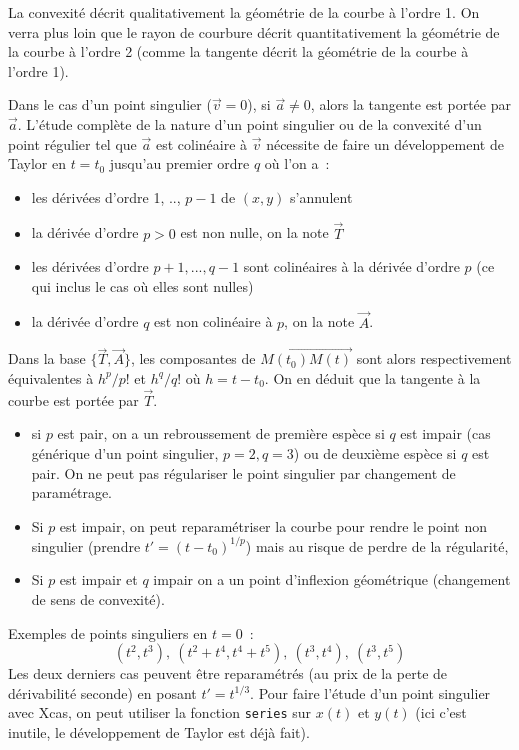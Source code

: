 \documentclass[a4paper,11pt]{article}
\begin{document}
La convexit\'e d\'ecrit qualitativement la g\'eom\'etrie
de la courbe \`a l'ordre 1. On verra plus loin que le rayon de courbure d\'ecrit
quantitativement la g\'eom\'etrie de la courbe \`a l'ordre
2 (comme la tangente d\'ecrit la g\'eom\'etrie de la courbe
\`a l'ordre 1).

Dans le cas d'un point singulier ($\overrightarrow{v}=0$), si 
$\overrightarrow{a}\neq 0$, alors la
tangente est port\'ee par $\overrightarrow{a}$. L'\'etude compl\`ete
de la nature
d'un point singulier ou de la convexit\'e d'un point r\'egulier
tel que $\overrightarrow{a}$ est colin\'eaire \`a $\overrightarrow{v}$ 
n\'ecessite de faire un
d\'eveloppement de Taylor en $t=t_0$
jusqu'au premier ordre $q$ o\`u l'on a~: 
\begin{itemize}
\item les d\'eriv\'ees d'ordre 1, .., $p-1$ de $(x,y)$ s'annulent
\item la d\'eriv\'ee d'ordre $p>0$ est non nulle, on la note $\overrightarrow{T}$
\item les d\'eriv\'ees d'ordre $p+1,...,q-1$ sont colin\'eaires
\`a la d\'eriv\'ee d'ordre $p$ (ce qui inclus le cas o\`u elles
sont nulles)
\item la d\'eriv\'ee d'ordre $q$ est non colin\'eaire \`a $p$,
on la note $\overrightarrow{A}$.
\end{itemize}
Dans la base $\{ \overrightarrow{T},\overrightarrow{A}\}$, les
composantes de $\overrightarrow{M(t_0)M(t)}$
sont alors respectivement \'equivalentes \`a $h^p/p!$ et $h^q/q!$
o\`u $h=t-t_0$.
On en d\'eduit que la tangente \`a la courbe est port\'ee par
$\overrightarrow{T}$.
\begin{itemize}
\item si $p$ est pair, on a un rebroussement 
de premi\`ere esp\`ece 
si $q$ est impair (cas g\'en\'erique d'un point singulier, $p=2, q=3$)
ou de deuxi\`eme esp\`ece si $q$ est pair. On ne peut pas
r\'egulariser le point singulier par changement de param\'etrage.
\item Si $p$ est impair, on peut reparam\'etriser la courbe
pour rendre le point non singulier (prendre $t'=(t-t_0)^{1/p}$)
mais au risque de perdre de la r\'egularit\'e,
\item Si $p$ est impair et $q$ impair on a un point d'inflexion 
g\'eom\'etrique (changement de sens de convexit\'e).
\end{itemize}

Exemples de points singuliers en $t=0$~: 
$$ (t^2,t^3), \ (t^2+t^4,t^4+t^5), \ (t^3,t^4), \ (t^3,t^5) $$
Les deux derniers cas peuvent \^etre reparam\'etr\'es (au prix
de la perte de d\'erivabilit\'e seconde) en posant $t'=t^{1/3}$.
Pour faire l'\'etude d'un point singulier avec Xcas, on peut utiliser
la fonction \verb|series| sur $x(t)$ et $y(t)$ (ici c'est inutile,
le d\'eveloppement de Taylor est d\'ej\`a fait).
\end{document}
